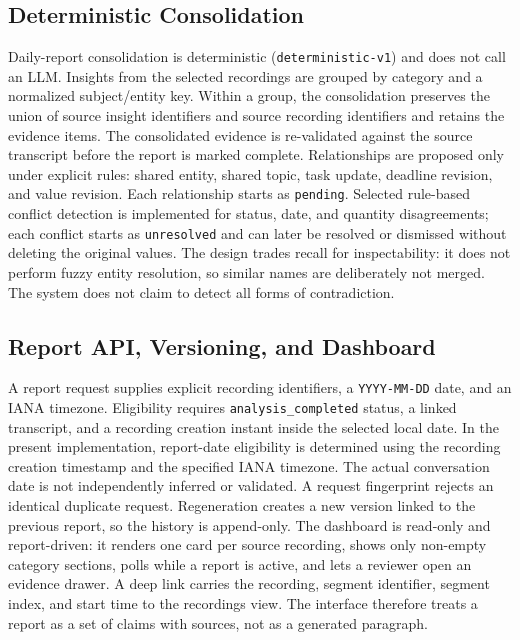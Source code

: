 \documentclass[10pt,a4paper]{article}
\newcommand{\code}[1]{\texttt{#1}}
\begin{document}
\subsection{Deterministic Consolidation}

Daily-report consolidation is deterministic (\code{deterministic-v1}) and does not call an
LLM. Insights from the selected recordings are grouped by category and a normalized
subject/entity key. Within a group, the consolidation preserves the union of source insight
identifiers and source recording identifiers and retains the evidence items. The
consolidated evidence is re-validated against the source transcript before the report is
marked complete. Relationships are proposed only under explicit rules: shared entity,
shared topic, task update, deadline revision, and value revision. Each relationship starts
as \code{pending}. Selected rule-based conflict detection is implemented for status, date,
and quantity disagreements; each conflict starts as \code{unresolved} and can later be
resolved or dismissed without deleting the original values. The design trades recall for
inspectability: it does not perform fuzzy entity resolution, so similar names are
deliberately not merged. The system does not claim to detect all forms of contradiction.

\subsection{Report API, Versioning, and Dashboard}

A report request supplies explicit recording identifiers, a \code{YYYY-MM-DD} date, and an
IANA timezone. Eligibility requires \code{analysis\_completed} status, a linked transcript,
and a recording creation instant inside the selected local date. In the present
implementation, report-date eligibility is determined using the recording creation
timestamp and the specified IANA timezone. The actual conversation date is not
independently inferred or validated. A request fingerprint rejects an identical duplicate
request. Regeneration creates a new version linked to the
previous report, so the history is append-only. The dashboard is read-only and
report-driven: it renders one card per source recording, shows only non-empty category
sections, polls while a report is active, and lets a reviewer open an evidence drawer. A
deep link carries the recording, segment identifier, segment index, and start time to the
recordings view. The interface therefore treats a report as a set of claims with sources,
not as a generated paragraph.
\end{document}
